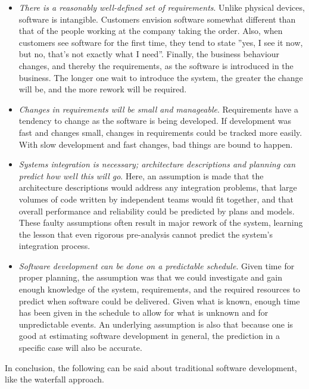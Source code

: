 \documentclass[a4paper,english,12pt]{report}
\begin{document}
\begin{itemize}
  \item\textit{There is a reasonably well-defined set of requirements}. Unlike physical devices, software is intangible. Customers envision software somewhat different than that of the people working at the company taking the order. Also, when customers see software for the first time, they tend to state ''yes,
I see it now, but no, that’s not exactly what I need''. Finally, the business behaviour changes, and thereby the requirements, as the software is introduced in the business. The longer one wait to introduce the system, the greater the change will be, and the more rework will be required.
  \item\textit{Changes in requirements will be small and manageable}. Requirements have a tendency to change as the software is being developed. If development was fast and changes small, changes in requirements could be tracked more easily. With slow development and fast changes, bad things are bound to happen.
  \item\textit{Systems integration is necessary; architecture descriptions and planning can predict how well this will go}. Here, an assumption is made that the architecture descriptions would address any integration problems, that large volumes of code written by independent teams would fit together, and that overall performance and reliability could be predicted by plans and models. These faulty assumptions often result in major rework of the system, learning the lesson that even rigorous pre-analysis cannot predict the system's integration process. 
  \item\textit{Software development can be done on a predictable schedule}. Given time for proper planning, the assumption was that we could investigate and gain enough knowledge of the system, requirements, and the required resources to predict when software could be delivered. Given what is known, enough time has been given in the schedule to allow for what is unknown and for unpredictable events. An underlying assumption is also that because one is good at estimating software development in general, the prediction in a specific case will also be accurate.
\end{itemize}

In conclusion, the following can be said about traditional software development, like the waterfall approach. \citep[p. 26]{leffingwell2007scaling}
\end{document}
